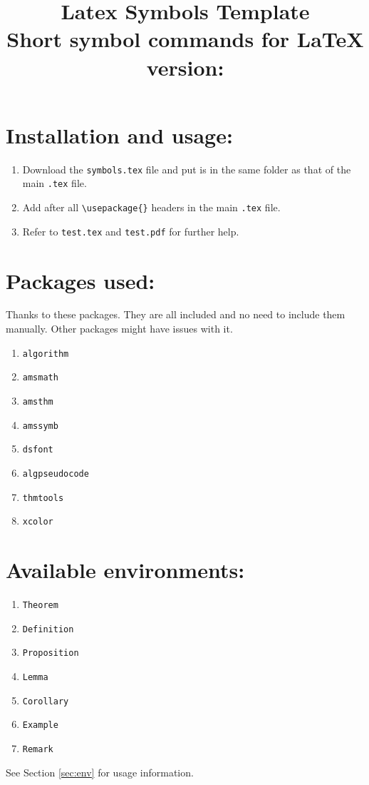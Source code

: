 \documentclass{article}
\title{\Huge{\textbf{Latex Symbols Template}} \\\vspace{10pt} \Large{Short symbol commands for \LaTeX} \\ \vspace{10pt} version: \Version \vspace{20pt}}
\author{\Author}
\date{\Update}
\begin{document}
	\maketitle\newpage
	\tableofcontents
	
	\newpage
	\section{Installation and usage:}
	\begin{enumerate}
		\item Download the \texttt{symbols.tex} file and put is in the same folder as that of the main \texttt{.tex} file.
		\item Add \verb|| after all \verb|\usepackage{}| headers in the main \texttt{.tex} file.
		\item Refer to \texttt{test.tex} and \texttt{test.pdf} for further help.
	\end{enumerate}
	
	\section{Packages used:}
	Thanks to these packages. They are all included and no need to include them manually. Other packages might have issues with it.
	\begin{enumerate}
		\item \texttt{algorithm}
		\item \texttt{amsmath}
		\item \texttt{amsthm}
		\item \texttt{amssymb}
		\item \texttt{dsfont}
		\item \texttt{algpseudocode}
		\item \texttt{thmtools}
		\item \texttt{xcolor}
	\end{enumerate}
	
	\section{Available environments:}
	\begin{enumerate}
		\item \texttt{Theorem}
		\item \texttt{Definition}
		\item \texttt{Proposition}
		\item \texttt{Lemma}
		\item \texttt{Corollary}
		\item \texttt{Example}
		\item \texttt{Remark}
	\end{enumerate}
	See Section \ref{sec:env} for usage information.
	
\end{document}
